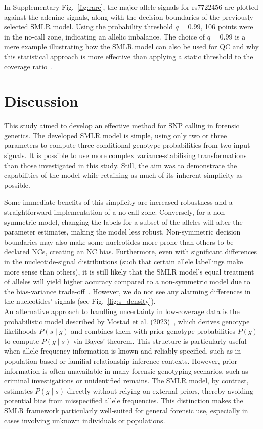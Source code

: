 \documentclass[preprint,5p,times,11pt]{elsarticle}
\begin{document}
In Supplementary Fig.~\ref{fig:rare}, the major allele signals for rs7722456 are plotted against the adenine signals, along with the decision boundaries of the previously selected SMLR model.
Using the probability threshold $q=0.99$, 106 points were in the no-call zone, indicating an allelic imbalance.
The choice of $q=0.99$ is a mere example illustrating how the SMLR model can also be used for QC and why this statistical approach is more effective than applying a static threshold to the coverage ratio~\cite[p.~35]{hid}.



\section{Discussion}
This study aimed to develop an effective method for SNP calling in forensic genetics.
The developed SMLR model is simple, using only two or three parameters to compute three conditional genotype probabilities from two input signals.
It is possible to use more complex variance-stabilising transformations than those investigated in this study.
Still, the aim was to demonstrate the capabilities of the model while retaining as much of its inherent simplicity as possible.

Some immediate benefits of this simplicity are increased robustness and a straightforward implementation of a no-call zone.
Conversely, for a non-symmetric model, changing the labels for a subset of the alleles will alter the parameter estimates, making the model less robust.
Non-symmetric decision boundaries may also make some nucleotides more prone than others to be declared NCs, creating an NC bias.
Furthermore, even with significant differences in the nucleotide-signal distributions (such that certain allele labellings make more sense than others), it is still likely that the SMLR model's equal treatment of alleles will yield higher accuracy compared to a non-symmetric model due to the bias-variance trade-off~\cite{shmueli}.
However, we do not see any alarming differences in the nucleotides' signals (see Fig.~\ref{fig:s_density}).\\


An alternative approach to handling uncertainty in low-coverage data is the probabilistic model described by Mostad et al. (2023)~\cite{mostad}, which derives genotype likelihoods $P(s \mid g)$ and combines them with prior genotype probabilities $P(g)$ to compute $P(g \mid s)$ via Bayes’ theorem.
This structure is particularly useful when allele frequency information is known and reliably specified, such as in population-based or familial relationship inference contexts.
However, prior information is often unavailable in many forensic genotyping scenarios, such as criminal investigations or unidentified remains.
The SMLR model, by contrast, estimates $P(g \mid s)$ directly without relying on external priors, thereby avoiding potential bias from misspecified allele frequencies.
This distinction makes the SMLR framework particularly well-suited for general forensic use, especially in cases involving unknown individuals or populations.\\
\end{document}
